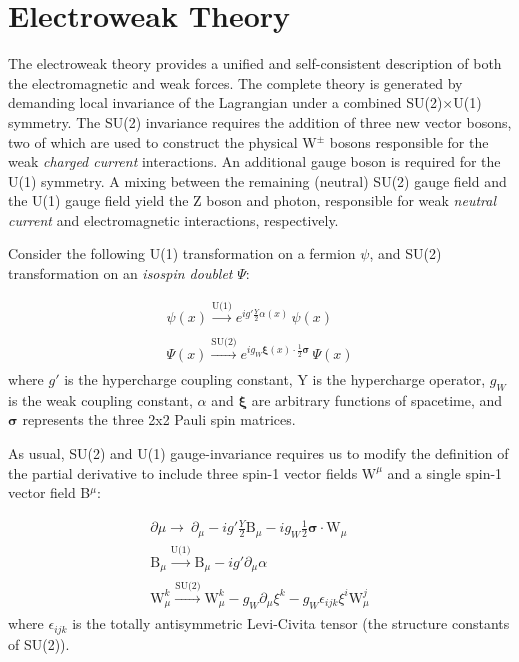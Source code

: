 \section{Electroweak Theory} 

The electroweak theory provides a unified and self-consistent description of both the electromagnetic and weak forces. The complete theory is generated by demanding local invariance of the Lagrangian under a combined SU(2)$\times$U(1) symmetry. The SU(2) invariance requires the addition of three new vector bosons, two of which are used to construct the physical W$^{\pm}$ bosons responsible for the weak \textit{charged current} interactions. An additional gauge boson is required for the U(1) symmetry. A mixing between the remaining (neutral) SU(2) gauge field and the U(1) gauge field yield the Z boson and photon, responsible for weak \textit{neutral current} and electromagnetic interactions, respectively. 

Consider the following U(1) transformation on a fermion $\psi$, and SU(2) transformation on an \textit{isospin doublet} $\Psi$:

\begin{equation}
\begin{array}{l}
\psi(x) \xrightarrow[]{\text{U(1)}} e^{i g' \frac{Y}{2} \alpha(x)} \, \psi(x) \\
\Psi(x) \xrightarrow[]{\text{SU(2)}} e^{i g_{W} \bm{\xi}(x) \cdot \frac{1}{2} \bm{\sigma} } \, \Psi(x) 
\end{array}
\end{equation}
where $g'$ is the hypercharge coupling constant, Y is the hypercharge operator, $g_{W}$ is the weak coupling constant, $\alpha$ and $\bm{\xi}$ are arbitrary functions of spacetime, and $\bm{\sigma}$ represents the three 2x2 Pauli spin matrices.

As usual, SU(2) and U(1) gauge-invariance requires us to modify the definition of the partial derivative to include three spin-1 vector fields $\bm{\mathrm{W}}^{\mu}$ and a single spin-1 vector field B$^{\mu}$:

\begin{equation}
\begin{array}{l}
\partial{\mu} \rightarrow\ \partial_{\mu} - i g' \frac{Y}{2}\mathrm{B}_{\mu} -  i g_{W} \frac{1}{2}\bm{\sigma} \cdot \bm{\mathrm{W}}_{\mu}\\
\mathrm{B}_{\mu} \xrightarrow[]{\text{U(1)}} \mathrm{B}_{\mu} - i g' \partial_{\mu} \alpha \\
\mathrm{W}^{k}_{\mu} \xrightarrow[]{\text{SU(2)}} \mathrm{W}^{k}_{\mu} - g_{W} \partial_{\mu} \xi^{k} -  g_{W} \epsilon_{ijk} \xi^{i} \mathrm{W}^{j}_{\mu}
 \end{array}
\end{equation}
where $\epsilon_{ijk}$ is the totally antisymmetric Levi-Civita tensor (the structure constants of SU(2)).

